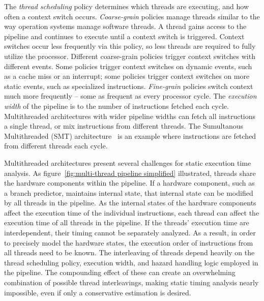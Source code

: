 The \emph{thread scheduling} policy determines which threads are executing, and how often a context switch occurs.  
\emph{Coarse-grain} policies manage threads similar to the way operation systems manage software threads.
A thread gains access to the pipeline and continues to execute until a context switch is triggered.
Context switches occur less frequently via this policy, so less threads are required to fully utilize the processor.
Different coarse-grain policies trigger context switches with different events. 
Some policies trigger context switches on dynamic events, such as a cache miss or an interrupt; some policies trigger context switches on more static events, such as specialized instructions.
\emph{Fine-grain} policies switch context much more frequently -- some as frequent as every processor cycle.
The \emph{execution width} of the pipeline is to the number of instructions fetched each cycle.  
Multithreaded architectures with wider pipeline widths can fetch all instructions a single thread, or mix instructions from different threads.
The Sumultanous Multithreaded (SMT) architecture~\cite{Tullsen1995SMT} is an example where instructions are fetched from different threads each cycle.

Multithreaded architectures present several challenges for static execution time analysis.
As figure~\ref{fig:multi-thread pipeline simplified} illustrated, threads share the hardware components within the pipeline.
If a hardware component, such as a branch predictor, maintains internal state, that internal state can be modified by all threads in the pipeline.
As the internal states of the hardware components affect the execution time of the individual instructions, each thread can affect the execution time of all threads in the pipeline. 
If the threads' execution time are interdependent, their timing cannot be separately analyzed.
As a result, in order to precisely model the hardware states, the execution order of instructions from all threads need to be known.
The interleaving of threads depend heavily on the thread scheduling policy, execution width, and hazard handling logic employed in the pipeline.
The compounding effect of these can create an overwhelming combination of possible thread interleavings, making static timing analysis nearly impossible, even if only a conservative estimation is desired.   

